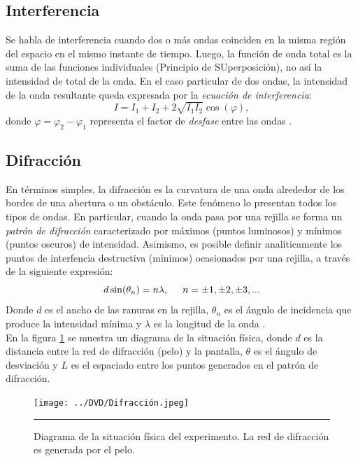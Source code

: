 \documentclass[10pt,a4paper]{article}
\begin{document}
\begin{multicols}{2}
		\subsection*{Interferencia} 
		Se habla de interferencia cuando dos o más ondas coinciden en la misma región del espacio en el mismo instante de tiempo. Luego, la función de onda total es la suma de las funciones individuales (Principio de SUperposición), no así la intensidad de total de la onda. En el caso particular de dos ondas, la intensidad de la onda resultante queda expresada por la \emph{ecuación de interferencia}:
		\begin{equation}
		I = I_1 + I_2 + 2\sqrt{I_1 I_2} \cos(\varphi),
		\end{equation}
		donde $\varphi = \varphi_2 - \varphi_1$ representa el factor de \emph{desfase} entre las ondas \cite{interferencia}.
		\subsection*{Difracción}
		En términos simples, la difracción es la curvatura de una onda alrededor de los bordes de una abertura o un obstáculo. Este fenómeno lo presentan todos los tipos de ondas. En particular, cuando la onda pasa por una rejilla se forma un \emph{patrón de difracción} caracterizado por máximos (puntos luminosos) y mínimos (puntos oscuros) de intensidad. Asimismo, es posible definir analíticamente los puntos de interfencia destructiva (minimos) ocasionados por una rejilla, a través de la siguiente expresión:
		\begin{equation}\label{minimos de intensidad}
		d \sin(\theta_n) = n \lambda, \hspace{5mm} n = \pm 1, \pm 2, \pm 3,... 
		\end{equation}
		Donde $d$ es el ancho de las ranuras en la rejilla, $\theta_n$ es el ángulo de incidencia que produce la intensidad mínima y $\lambda$ es la longitud de la onda \cite{wikidifrac}. \\
		En la figura \ref{Red de difracción} se muestra un diagrama de la situación física, donde $d$ es la distancia entre la red de difracción (pelo) y la pantalla, $\theta$ es el ángulo de desviación y $L$ es el espaciado entre los puntos generados en el patrón de difracción. 
		
		\begin{figure}[H]
			\centering
			\texttt{[image: ../DVD/Difracción.jpeg]} 
			\caption{Diagrama de la situación física del experimento. La red de difracción es generada por el pelo.}
			\label{Red de difracción}
			\rule{80mm}{0.1mm}
		\end{figure}
		

\end{multicols}
\end{document}
